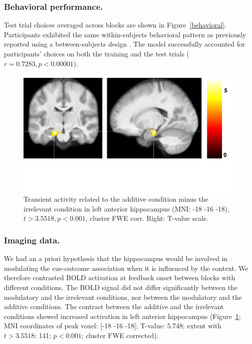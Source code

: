 \documentclass[10pt,letterpaper]{article}
\begin{document}
\subsubsection{Behavioral performance.}

Test trial choices averaged across blocks are shown in Figure~\ref{behavioral}. Participants exhibited the same within-subjects behavioral pattern as previously reported using a between-subjects design \cite{Gershman2017}. The model successfully accounted for participants' choices on both the training and the test trials ($r = 0.7283, p < 0.00001$).

\begin{figure}[ht]
\begin{center}
\includegraphics[scale=0.33,  trim = 0 150 0 0]{additive-irrelevant.pdf}
\end{center}
\caption{Transient activity related to the additive condition minus the irrelevant condition in left anterior hippocampus (MNI: -18 -16 -18), $t > 3.5518, p < 0.001$, cluster FWE corr. Right: T-value scale.} 
\label{additive-irrelevant}
\end{figure}

\subsubsection{Imaging data.} 

We had an a priori hypothesis that the hippocampus would be involved in modulating the cue-outcome association when it is influenced by the context. We therefore contrasted BOLD activation at feedback onset between blocks with different conditions. The BOLD signal did not differ significantly between the modulatory and the irrelevant conditions, nor between the modulatory and the additive conditions. The contrast between the additive and the irrelevant conditions showed increased activation in left anterior hippocampus (Figure~\ref{additive-irrelevant}; MNI coordinates of peak voxel: [-18 -16 -18]; T-value: 5.748; extent with $t > 3.5518$: 141; $p < 0.001$; cluster FWE corrected).
\end{document}
